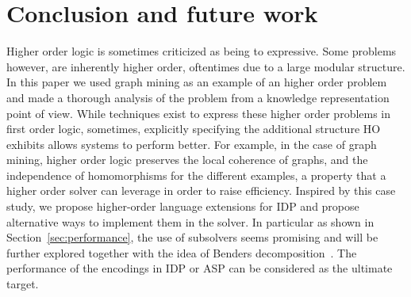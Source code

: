 \section{Conclusion and future work}
\label{sec:conclusion}
Higher order logic is sometimes criticized as being to expressive.
Some problems however, are inherently higher order, oftentimes due to
a large modular structure.
In this paper we used graph mining as an example of an higher order
problem and made a thorough analysis of the problem from a knowledge
representation point of view.
While techniques exist to express these higher order problems in first order logic,
sometimes, explicitly specifying the additional structure HO exhibits
allows systems to perform better.
For example, in the case of graph mining, higher order logic preserves
the local coherence of graphs, and the independence of homomorphisms
for the different examples, a property that a higher order solver can
leverage in order to raise efficiency.
Inspired by this case study, we propose higher-order language
extensions for IDP and propose alternative ways to implement them in the
solver. In particular as shown in Section~\ref{sec:performance}, the use of subsolvers seems promising and will be further explored together with the idea of Benders decomposition~\citep{Benders}.
The performance of the encodings in IDP or ASP can be considered as
the ultimate target.